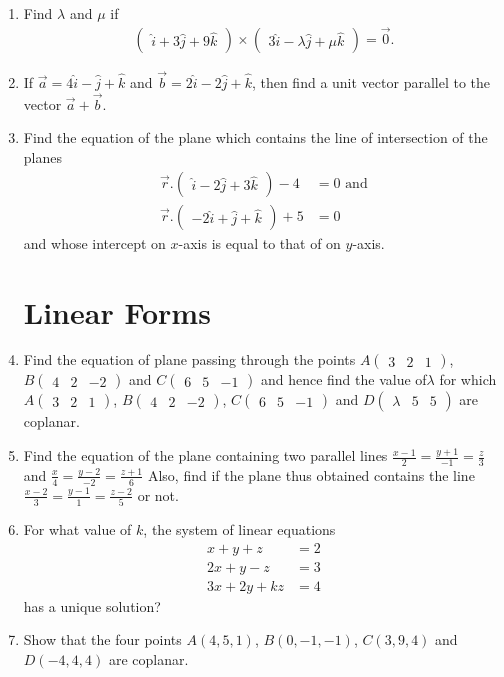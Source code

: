 \documentclass[12pt,-letter paper]{article}
\newcommand{\myvec}[1]{\ensuremath{\begin{pmatrix}#1\end{pmatrix}}}
\begin{document}
\begin{enumerate}
	\item Find $\lambda$ and $\mu$ if
	\begin{align*}
		\myvec{\hat{i} + 3\hat{j} + 9\hat{k}} \times \myvec{3\hat{i} - \lambda \hat{j} + \mu \hat{k}} = \overrightarrow{0}.
	\end{align*}

	\item If $\overrightarrow{a} = 4\hat{i} - \hat{j} +\hat{k}$ and $\overrightarrow{b} = 2\hat{i} - 2\hat{j} + \hat{k}$, then find a unit vector parallel to the vector $\overrightarrow{a}+\overrightarrow{b}$.

	\item Find the equation of the plane which contains the line of intersection of the planes
	\begin{align*}
		\overrightarrow{r}.\myvec{\hat{i} - 2\hat{j} + 3\hat{k}} - 4 &= 0 \text{  and}\\
		\overrightarrow{r}.\myvec{-2\hat{i} + \hat{j} + \hat{k}} + 5 &= 0
	\end{align*}
and whose intercept on $x$-axis is equal to that of on $y$-axis.



\section{Linear Forms}
	\item Find the equation of plane passing through the points $A\myvec{3 & 2 & 1}$,
$B\myvec{4 & 2 & -2}$ and $C\myvec{6 & 5 & -1}$ and hence find the value of$\lambda$ for which 
$A\myvec{3 & 2 & 1}$, $B\myvec{4 & 2 & -2}$, $C\myvec{6 & 5 & -1}$ and $D\myvec{\lambda & 5 & 5}$
are coplanar.

	\item Find the equation of the plane containing two parallel lines
$\frac{x-1}{2} = \frac{y+1}{-1} = \frac{z}{3}$ and $\frac{x}{4} = \frac{y-2}{-2} = \frac{z+1}{6}$
Also, find if the plane thus obtained contains the line 
$\frac{x-2}{3} =\frac{y-1}{1} = \frac{z-2}{5}$ or not.



	\item For what value of $k$, the system of linear equations 
	\begin{align*}
		x+y+z &= 2\\
		2x+y-z &=3\\
		3x+2y+kz &=4
	\end{align*}
	has a unique solution? 
	
	\item Show that the four points $A(4,5,1)$, $ B(0,-1,-1)$, 
$C(3,9,4)$ and $D(-4,4,4)$ are coplanar.


\end{enumerate}
\end{document}
